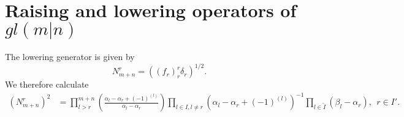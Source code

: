 \documentclass[12pt]{article}
\def\nn{\nonumber}
\begin{document}
\section{Raising and lowering operators of $gl(m|n)$}

The lowering generator is given by
$$
N^r_{m+n}  = \left((f_r)^r_r \delta_r \right)^{1/2}.
$$
We therefore calculate
\begin{align*}
\left(N^r_{m+n}\right)^2 &=  \prod_{l > r}^{m+n} \left( \frac{\alpha_l - \alpha_r + (-1)^{(l)} }{\alpha_l - \alpha_r  } \right) \prod_{l\in I, l\neq r} (\alpha_l - \alpha_r +
(-1)^{(l)})^{-1}\prod_{l\in \tilde{I}} (\beta_l-\alpha_r), \ \ r\in I' .
\end{align*}
\end{document}
